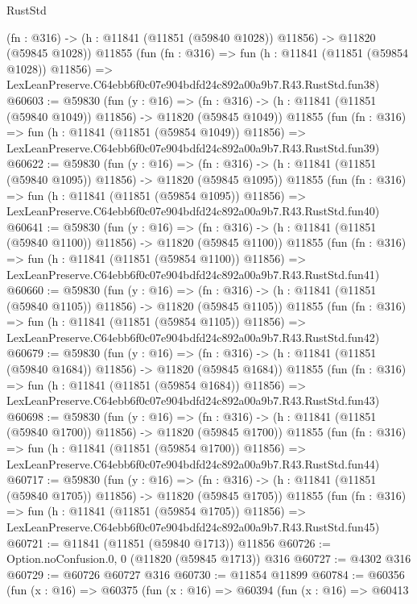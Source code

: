 \begin{lexlean}{RustStd}
\begin{coremodule}
    (fn : @316) -> (h : @11841 (@11851 (@59840 @1028)) @11856) -> @11820 (@59845 @1028))
    @11855
    (fun (fn : @316) =>
    fun (h : @11841 (@11851 (@59854 @1028)) @11856) =>
    LexLeanPreserve.C64ebb6f0c07e904bdfd24c892a00a9b7.R43.RustStd.fun38)
@60603 := @59830
    (fun (y : @16) =>
    (fn : @316) -> (h : @11841 (@11851 (@59840 @1049)) @11856) -> @11820 (@59845 @1049))
    @11855
    (fun (fn : @316) =>
    fun (h : @11841 (@11851 (@59854 @1049)) @11856) =>
    LexLeanPreserve.C64ebb6f0c07e904bdfd24c892a00a9b7.R43.RustStd.fun39)
@60622 := @59830
    (fun (y : @16) =>
    (fn : @316) -> (h : @11841 (@11851 (@59840 @1095)) @11856) -> @11820 (@59845 @1095))
    @11855
    (fun (fn : @316) =>
    fun (h : @11841 (@11851 (@59854 @1095)) @11856) =>
    LexLeanPreserve.C64ebb6f0c07e904bdfd24c892a00a9b7.R43.RustStd.fun40)
@60641 := @59830
    (fun (y : @16) =>
    (fn : @316) -> (h : @11841 (@11851 (@59840 @1100)) @11856) -> @11820 (@59845 @1100))
    @11855
    (fun (fn : @316) =>
    fun (h : @11841 (@11851 (@59854 @1100)) @11856) =>
    LexLeanPreserve.C64ebb6f0c07e904bdfd24c892a00a9b7.R43.RustStd.fun41)
@60660 := @59830
    (fun (y : @16) =>
    (fn : @316) -> (h : @11841 (@11851 (@59840 @1105)) @11856) -> @11820 (@59845 @1105))
    @11855
    (fun (fn : @316) =>
    fun (h : @11841 (@11851 (@59854 @1105)) @11856) =>
    LexLeanPreserve.C64ebb6f0c07e904bdfd24c892a00a9b7.R43.RustStd.fun42)
@60679 := @59830
    (fun (y : @16) =>
    (fn : @316) -> (h : @11841 (@11851 (@59840 @1684)) @11856) -> @11820 (@59845 @1684))
    @11855
    (fun (fn : @316) =>
    fun (h : @11841 (@11851 (@59854 @1684)) @11856) =>
    LexLeanPreserve.C64ebb6f0c07e904bdfd24c892a00a9b7.R43.RustStd.fun43)
@60698 := @59830
    (fun (y : @16) =>
    (fn : @316) -> (h : @11841 (@11851 (@59840 @1700)) @11856) -> @11820 (@59845 @1700))
    @11855
    (fun (fn : @316) =>
    fun (h : @11841 (@11851 (@59854 @1700)) @11856) =>
    LexLeanPreserve.C64ebb6f0c07e904bdfd24c892a00a9b7.R43.RustStd.fun44)
@60717 := @59830
    (fun (y : @16) =>
    (fn : @316) -> (h : @11841 (@11851 (@59840 @1705)) @11856) -> @11820 (@59845 @1705))
    @11855
    (fun (fn : @316) =>
    fun (h : @11841 (@11851 (@59854 @1705)) @11856) =>
    LexLeanPreserve.C64ebb6f0c07e904bdfd24c892a00a9b7.R43.RustStd.fun45)
@60721 := @11841 (@11851 (@59840 @1713)) @11856
@60726 := Option.noConfusion.{0, 0} (@11820 (@59845 @1713)) @316
@60727 := @4302 @316
@60729 := @60726 @60727 @316
@60730 := @11854 @11899
@60784 := @60356
    (fun (x : @16) =>
    @60375
      (fun (x : @16) =>
      @60394
        (fun (x : @16) =>
        @60413

\end{coremodule}
\end{lexlean}
